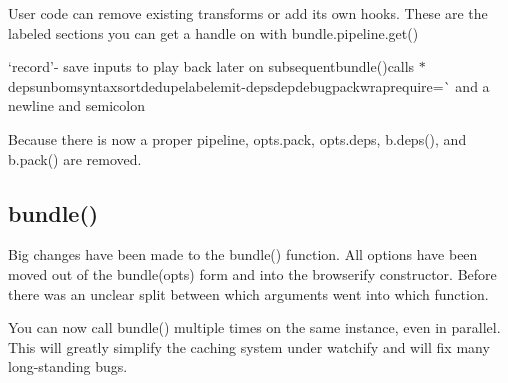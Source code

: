User code can remove existing transforms or add its own hooks. These are the labeled sections you can get a handle on with {\ttfamily bundle.\+pipeline.\+get()}


\begin{DoxyItemize}
\item `\textquotesingle{}record'{\ttfamily -\/ save inputs to play back later on subsequent}bundle(){\ttfamily calls $\ast$}\textquotesingle{}deps\textquotesingle{}unbom\textquotesingle{}syntax\textquotesingle{}sort\textquotesingle{}dedupe\textquotesingle{}label\textquotesingle{}emit-\/deps\textquotesingle{}dep\textquotesingle{}debug\textquotesingle{}pack\textquotesingle{}wraprequire=\`{} and a newline and semicolon
\end{DoxyItemize}

Because there is now a proper pipeline, {\ttfamily opts.\+pack}, {\ttfamily opts.\+deps}, {\ttfamily b.\+deps()}, and {\ttfamily b.\+pack()} are removed.

\subsection*{bundle()}

Big changes have been made to the {\ttfamily bundle()} function. All options have been moved out of the {\ttfamily bundle(opts)} form and into the browserify constructor. Before there was an unclear split between which arguments went into which function.

You can now call {\ttfamily bundle()} multiple times on the same instance, even in parallel. This will greatly simplify the caching system under watchify and will fix many long-\/standing bugs.

